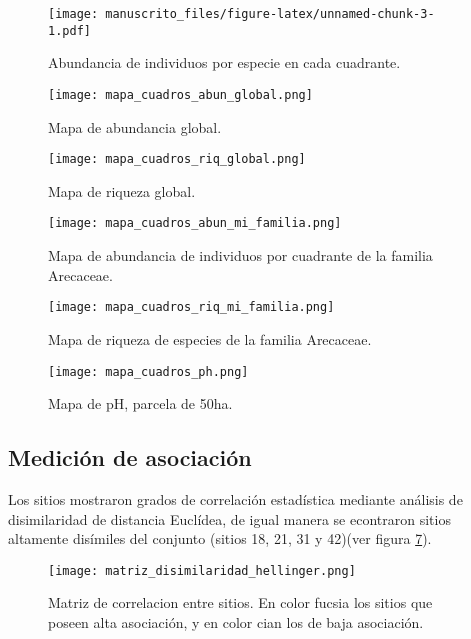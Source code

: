 \documentclass[11pt,]{article}
\begin{document}
\begin{figure}
\centering
\texttt{[image: manuscrito\_files/figure-latex/unnamed-chunk-3-1.pdf]}
\caption{\label{fig:abun_sp_q}Abundancia de individuos por especie en
cada cuadrante.}
\end{figure}

\begin{figure}
\centering
\texttt{[image: mapa\_cuadros\_abun\_global.png]}
\caption{Mapa de abundancia global.
\label{fig:mapa_cuadros_abun_global}}
\end{figure}

\begin{figure}
\centering
\texttt{[image: mapa\_cuadros\_riq\_global.png]}
\caption{Mapa de riqueza global. \label{fig:mapa_cuadros_riq_global}}
\end{figure}

\begin{figure}
\centering
\texttt{[image: mapa\_cuadros\_abun\_mi\_familia.png]}
\caption{Mapa de abundancia de individuos por cuadrante de la familia
Arecaceae. \label{fig:mapa_cuadros_abun_mi_familia}}
\end{figure}

\begin{figure}
\centering
\texttt{[image: mapa\_cuadros\_riq\_mi\_familia.png]}
\caption{Mapa de riqueza de especies de la familia Arecaceae.
\label{fig:mapa_cuadros_riq_mi_familia}}
\end{figure}

\begin{figure}
\centering
\texttt{[image: mapa\_cuadros\_ph.png]}
\caption{Mapa de pH, parcela de 50ha. \label{fig:mapa_cuadros_pH}}
\end{figure}

\subsection{Medición de
asociación}\label{mediciuxf3n-de-asociaciuxf3n-1}

Los sitios mostraron grados de correlación estadística mediante análisis
de disimilaridad de distancia Euclídea, de igual manera se econtraron
sitios altamente disímiles del conjunto (sitios 18, 21, 31 y 42)(ver
figura \ref{fig:matriz_disimilaridad_hellinger}).

\begin{figure}
\centering
\texttt{[image: matriz\_disimilaridad\_hellinger.png]}
\caption{Matriz de correlacion entre sitios. En color fucsia los sitios
que poseen alta asociación, y en color cian los de baja asociación.
\label{fig:matriz_disimilaridad_hellinger}}
\end{figure}
\end{document}
